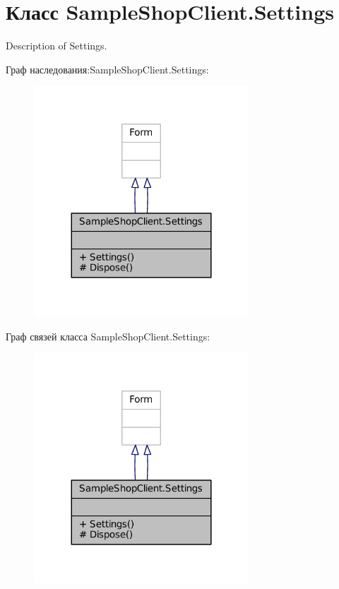 \hypertarget{class_sample_shop_client_1_1_settings}{}\section{Класс Sample\+Shop\+Client.\+Settings}
\label{class_sample_shop_client_1_1_settings}


Description of Settings.  




Граф наследования\+:Sample\+Shop\+Client.\+Settings\+:
\nopagebreak
\begin{figure}[H]
\begin{center}
\leavevmode
\includegraphics[width=228pt]{class_sample_shop_client_1_1_settings__inherit__graph}
\end{center}
\end{figure}


Граф связей класса Sample\+Shop\+Client.\+Settings\+:
\nopagebreak
\begin{figure}[H]
\begin{center}
\leavevmode
\includegraphics[width=228pt]{class_sample_shop_client_1_1_settings__coll__graph}
\end{center}
\end{figure}
